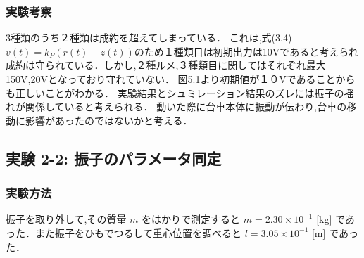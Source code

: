 \subsubsection{実験考察}
3種類のうち２種類は成約を超えてしまっている．
これは,式(3.4)\(v(t) = k_P \left( r(t) - z(t) \right)\)のため１種類目は初期出力は10Vであると考えられ
成約は守られている．しかし,２種ルメ,３種類目に関してはそれぞれ最大150V,20Vとなっており守れていない．
図5.1より初期値が１０Vであることからも正しいことがわかる．
実験結果とシュミレーション結果のズレには振子の揺れが関係していると考えられる．
動いた際に台車本体に振動が伝わり,台車の移動に影響があったのではないかと考える．



\subsection{実験 2-2: 振子のパラメータ同定}
\subsubsection{実験方法}

振子を取り外して,その質量 \( m \) をはかりで測定すると \( m = 2.30 \times 10^{-1} \) [kg] であった．また振子をひもでつるして重心位置を調べると \( l = 3.05 \times 10^{-1} \) [m] であった．

